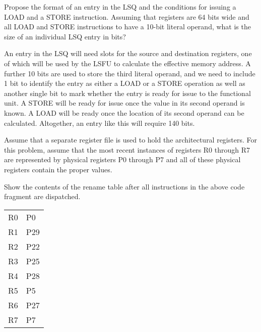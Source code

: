 \documentclass[12pt,letterpaper,twoside]{hmcpset}
\begin{document}
\begin{problem}[1]
 Propose the format of an entry in the LSQ and the conditions for issuing a LOAD and a STORE instruction.  Assuming that registers are 64 bits wide and all LOAD and STORE instructions to have a 10-bit literal operand, what is the size of an individual LSQ entry in bits?
\end{problem}

\begin{solution}
 An entry in the LSQ will need slots for the source and destination registers, one of which will be used by the LSFU to calculate the effective memory address.
 A further 10 bits are used to store the third literal operand, and we need to include 1 bit to identify the entry as either a LOAD or a STORE operation as well as another single bit to mark whether the entry is ready for issue to the functional unit.
 A STORE will be ready for issue once the value in its second operand is known.
 A LOAD will be ready once the location of its second operand can be calculated.
 Altogether, an entry like this will require 140 bits.
\end{solution}

\begin{problem}[2]
 Assume that a separate register file is used to hold the architectural registers. For this problem, assume that the most recent instances of registers R0 through R7 are represented by physical registers P0 through P7 and all of these physical registers contain the proper values.
\end{problem}

\begin{problem}[2a]
Show the contents of the rename table after all instructions in the above code fragment are dispatched.
\end{problem}

\begin{solution}
 \begin{center}
\begin{tabular}{l|l}
R0 & P0\\
R1 & P29\\
R2 & P22\\
R3 & P25\\
R4 & P28\\
R5 & P5\\
R6 & P27\\
R7 & P7
 \end{tabular}
 \end{center}

\end{solution}
\end{document}
